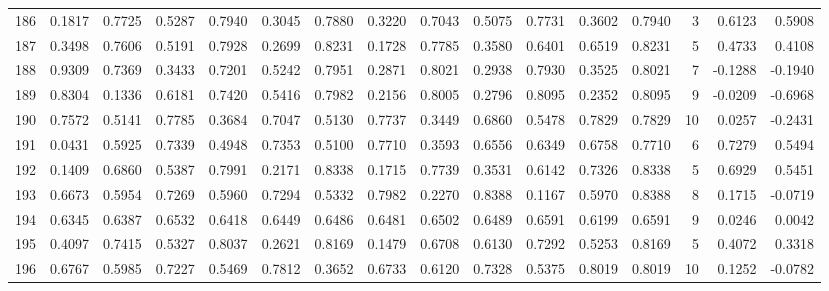 \begin{tabular}{lrrrrrrrrrrrrrrr}
186 &      0.1817 &  0.7725 &  0.5287 &  0.7940 &  0.3045 &  0.7880 &  0.3220 &  0.7043 &  0.5075 &  0.7731 &   0.3602 &     0.7940 &      3 &                    0.6123 &                     0.5908 \\
187 &      0.3498 &  0.7606 &  0.5191 &  0.7928 &  0.2699 &  0.8231 &  0.1728 &  0.7785 &  0.3580 &  0.6401 &   0.6519 &     0.8231 &      5 &                    0.4733 &                     0.4108 \\
188 &      0.9309 &  0.7369 &  0.3433 &  0.7201 &  0.5242 &  0.7951 &  0.2871 &  0.8021 &  0.2938 &  0.7930 &   0.3525 &     0.8021 &      7 &                   -0.1288 &                    -0.1940 \\
189 &      0.8304 &  0.1336 &  0.6181 &  0.7420 &  0.5416 &  0.7982 &  0.2156 &  0.8005 &  0.2796 &  0.8095 &   0.2352 &     0.8095 &      9 &                   -0.0209 &                    -0.6968 \\
190 &      0.7572 &  0.5141 &  0.7785 &  0.3684 &  0.7047 &  0.5130 &  0.7737 &  0.3449 &  0.6860 &  0.5478 &   0.7829 &     0.7829 &     10 &                    0.0257 &                    -0.2431 \\
191 &      0.0431 &  0.5925 &  0.7339 &  0.4948 &  0.7353 &  0.5100 &  0.7710 &  0.3593 &  0.6556 &  0.6349 &   0.6758 &     0.7710 &      6 &                    0.7279 &                     0.5494 \\
192 &      0.1409 &  0.6860 &  0.5387 &  0.7991 &  0.2171 &  0.8338 &  0.1715 &  0.7739 &  0.3531 &  0.6142 &   0.7326 &     0.8338 &      5 &                    0.6929 &                     0.5451 \\
193 &      0.6673 &  0.5954 &  0.7269 &  0.5960 &  0.7294 &  0.5332 &  0.7982 &  0.2270 &  0.8388 &  0.1167 &   0.5970 &     0.8388 &      8 &                    0.1715 &                    -0.0719 \\
194 &      0.6345 &  0.6387 &  0.6532 &  0.6418 &  0.6449 &  0.6486 &  0.6481 &  0.6502 &  0.6489 &  0.6591 &   0.6199 &     0.6591 &      9 &                    0.0246 &                     0.0042 \\
195 &      0.4097 &  0.7415 &  0.5327 &  0.8037 &  0.2621 &  0.8169 &  0.1479 &  0.6708 &  0.6130 &  0.7292 &   0.5253 &     0.8169 &      5 &                    0.4072 &                     0.3318 \\
196 &      0.6767 &  0.5985 &  0.7227 &  0.5469 &  0.7812 &  0.3652 &  0.6733 &  0.6120 &  0.7328 &  0.5375 &   0.8019 &     0.8019 &     10 &                    0.1252 &                    -0.0782 \\

\end{tabular}
